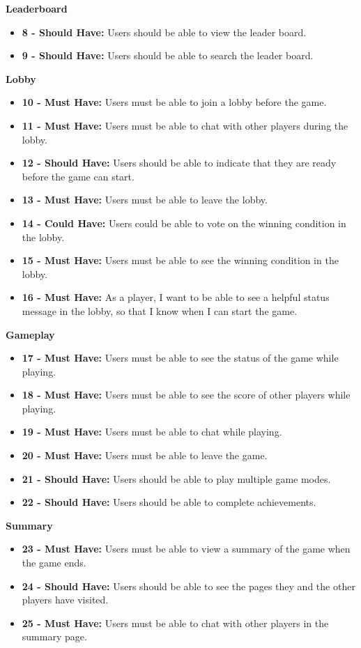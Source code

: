 \documentclass{l4proj}
\begin{document}
\textbf{Leaderboard}
\begin{itemize}
    \item[] \textbf{8 - Should Have:} Users should be able to view the leader board.
    \item[] \textbf{9 - Should Have:} Users should be able to search the leader board.
\end{itemize}

\textbf{Lobby}
\begin{itemize}
    \item[] \textbf{10 - Must Have:} Users must be able to join a lobby before the game.
    \item[] \textbf{11 - Must Have:} Users must be able to chat with other players during the lobby.
    \item[] \textbf{12 - Should Have:} Users should be able to indicate that they are ready before the game can start.
    \item[] \textbf{13 - Must Have:} Users must be able to leave the lobby.
    \item[] \textbf{14 - Could Have:} Users could be able to vote on the winning condition in the lobby.
    \item[] \textbf{15 - Must Have:} Users must be able to see the winning condition in the lobby.
    \item[] \textbf{16 - Must Have:} As a player, I want to be able to see a helpful status message in the lobby, so that I know when I can start the game.
\end{itemize}

\textbf{Gameplay}
\begin{itemize}
    \item[] \textbf{17 - Must Have:} Users must be able to see the status of the game while playing.
    \item[] \textbf{18 - Must Have:} Users must be able to see the score of other players while playing.
    \item[] \textbf{19 - Must Have:} Users must be able to chat while playing.
    \item[] \textbf{20 - Must Have:} Users must be able to leave the game.
    \item[] \textbf{21 - Should Have:} Users should be able to play multiple game modes.
    \item[] \textbf{22 - Should Have:} Users should be able to complete achievements.
\end{itemize}

\textbf{Summary}
\begin{itemize}
    \item[] \textbf{23 - Must Have:}  Users must be able to view a summary of the game when the game ends.
    \item[] \textbf{24 - Should Have:} Users should be able to see the pages they and the other players have visited.
    \item[] \textbf{25 - Must Have:}  Users must be able to chat with other players in the summary page.
\end{itemize}
\end{document}
